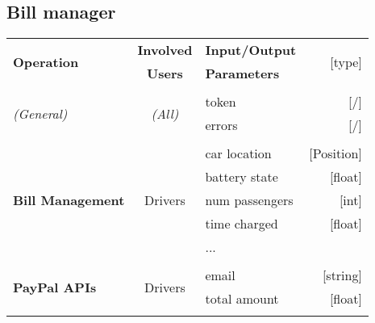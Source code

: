 \subsection{Bill manager}
	\begin{center}
		\begin{tabular}{ l | c | l   r }
			\multirow{2}{*}{\textbf{Operation}} & \textbf{Involved} & \textbf{Input/Output} & \multirow{2}{*}{[type]}\\
			& \textbf{Users} & \textbf{Parameters} & \\ [1.5ex]
			\hline\hline\\
			
			\multirow{2}{*}{\textit{(General)}}
				& \multirow{2}{*}{\textit{(All)}}
					&	token & [/]\\
					&&	errors & [/]\\ [1.5ex]
			\hline\\
			
			\multirow{5}{*}{\textbf{Bill Management}}
				& \multirow{5}{*}{Drivers}
					&	car location & [Position]\\
					&&	battery state & [float]\\
					&&	num passengers & [int]\\
					&&	time charged & [float]\\
					&&	... & \\ [1.5ex]
			\hline\\
			
			\multirow{2}{*}{\textbf{PayPal APIs}}
				& \multirow{2}{*}{Drivers}
					&	email & [string]\\
					&&	total amount & [float]\\ [1.5ex]
			\hline\\

		\end{tabular}
	\end{center}

